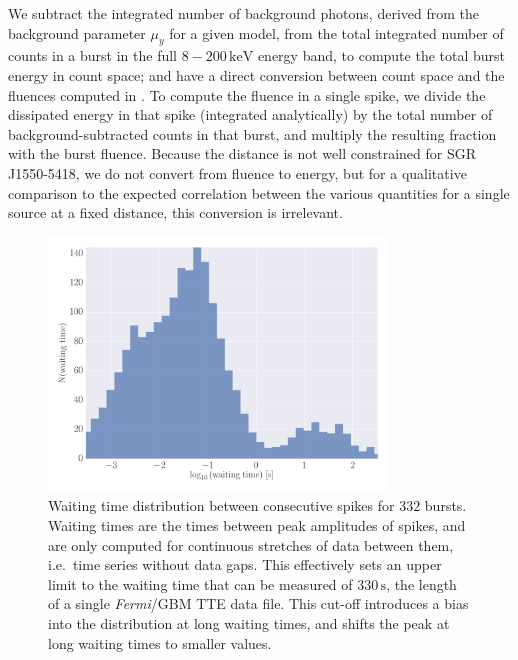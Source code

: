 \documentclass[12pt]{emulateapj}
\newcommand{\project}[1]{\textsl{#1}}
\newcommand{\fermi}{\project{Fermi}}
\newcommand{\counts}{y}
\begin{document}
 We subtract the integrated number of 
 background photons, derived from the background parameter $\mu_\counts$ for a given model, from the total integrated number of 
 counts in a burst in the full $8-200\,\mathrm{keV}$ energy band, to compute the total burst energy in count space; and have a direct conversion between count space and 
 the fluences computed in \citet{vanderhorst2012}. To compute the fluence in a single spike, we divide the dissipated energy in that spike (integrated analytically)
 by the total number of background-subtracted counts in that burst, and multiply the resulting fraction with the burst fluence. 
 Because the distance is not well constrained for SGR J1550-5418, we do not convert from fluence to energy, but for a qualitative comparison to the expected correlation between the 
 various quantities for a single source at a fixed distance, this conversion is irrelevant.
  \begin{figure}[htbp]
\begin{center}
\includegraphics[width=9cm]{ch6f6.pdf}%
\caption{Waiting time distribution between consecutive spikes for $332$ bursts. Waiting times are the times between peak amplitudes of spikes, and are only computed for
continuous stretches of data between them, i.e.\ time series without data gaps. This effectively sets an upper limit to the waiting time that can be measured of $330\,\mathrm{s}$, the 
length of a single \fermi/GBM TTE data file. This cut-off introduces a bias into the distribution at long waiting times, and shifts the peak at long waiting times to smaller values.}
\label{fig:waitingtimes}
\end{center}
\end{figure}
\end{document}

